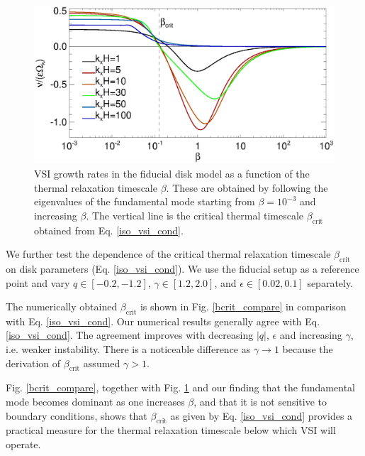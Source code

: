 \begin{figure}
   \includegraphics[width=\linewidth]{figures/gcorr_compare2} 
   \caption{VSI growth rates in the fiducial disk
     model as a function of the thermal relaxation timescale
     $\beta$. These are obtained by following the eigenvalues of the
     fundamental mode starting from $\beta=10^{-3}$ and increasing
     $\beta$. The vertical line is the
     critical thermal timescale $\beta_\mathrm{crit}$ obtained  
     from Eq. \ref{iso_vsi_cond}. 
     \label{bcrit_compare1}}   
 \end{figure} 
 
 We further test the dependence of the critical thermal relaxation timescale 
 $\beta_\mathrm{crit}$ on disk parameters (Eq. \ref{iso_vsi_cond}).
 We use the fiducial setup as a  reference point and vary
 $q\in[-0.2,-1.2]$,  $\gamma\in[1.2,2.0]$, and $\epsilon\in[0.02,0.1]$ 
 separately.

 The numerically obtained $\beta_\mathrm{crit}$ is shown in
 Fig. \ref{bcrit_compare} in comparison with Eq. \ref{iso_vsi_cond}.
 Our numerical results generally agree with Eq. \ref{iso_vsi_cond}. The
 agreement improves with decreasing  $|q|$,  $\epsilon$ and increasing
 $\gamma$, i.e. weaker instability. There is a noticeable difference
 as $\gamma\to1$ because the derivation of $\beta_\mathrm{crit}$
 assumed $\gamma>1$.   
 
 Fig. \ref{bcrit_compare}, together with Fig. \ref{bcrit_compare1} and 
 our finding that the fundamental mode becomes dominant as one
 increases $\beta$, and that it is not sensitive to boundary
 conditions, shows that $\beta_\mathrm{crit}$ as given  by
 Eq. \ref{iso_vsi_cond} provides a practical measure for the thermal
 relaxation timescale below which  VSI will operate. 

